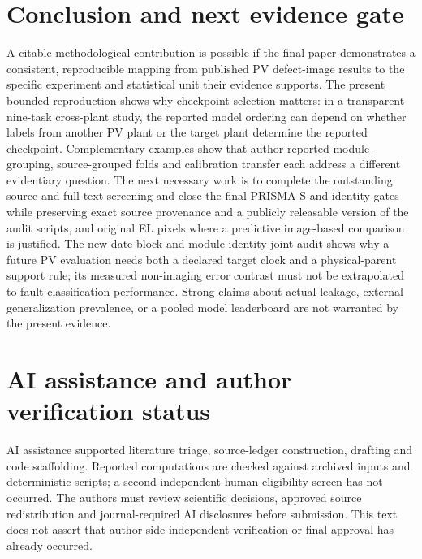 \documentclass[10pt,a4paper]{article}
\begin{document}
\section{Conclusion and next evidence gate}
A citable methodological contribution is possible if the final paper demonstrates a consistent, reproducible mapping from published PV defect-image results to the specific experiment and statistical unit their evidence supports. The present bounded reproduction shows why checkpoint selection matters: in a transparent nine-task cross-plant study, the reported model ordering can depend on whether labels from another PV plant or the target plant determine the reported checkpoint. Complementary examples show that author-reported module-grouping, source-grouped folds and calibration transfer each address a different evidentiary question. The next necessary work is to complete the outstanding source and full-text screening and close the final PRISMA-S and identity gates while preserving exact source provenance and a publicly releasable version of the audit scripts, and original EL pixels where a predictive image-based comparison is justified. The new date-block and module-identity joint audit shows why a future PV evaluation needs both a declared target clock and a physical-parent support rule; its measured non-imaging error contrast must not be extrapolated to fault-classification performance. Strong claims about actual leakage, external generalization prevalence, or a pooled model leaderboard are not warranted by the present evidence.

\section*{AI assistance and author verification status}
AI assistance supported literature triage, source-ledger construction, drafting and code scaffolding. Reported computations are checked against archived inputs and deterministic scripts; a second independent human eligibility screen has not occurred. The authors must review scientific decisions, approved source redistribution and journal-required AI disclosures before submission. This text does not assert that author-side independent verification or final approval has already occurred.
\end{document}
